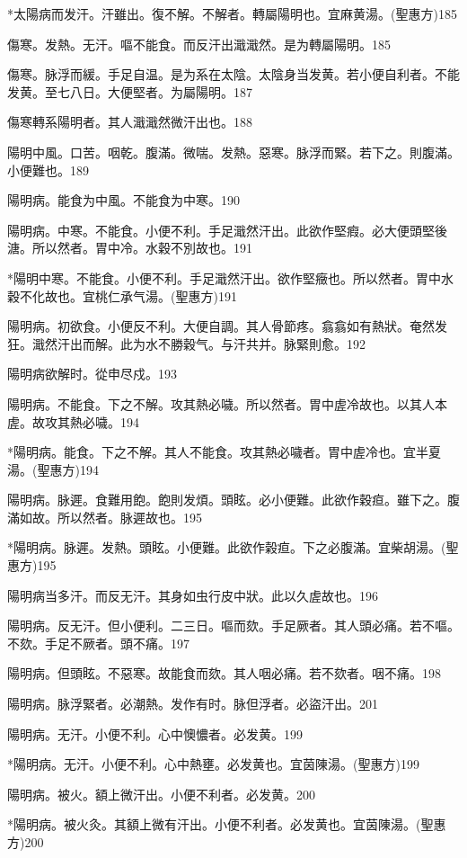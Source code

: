 \documentclass[b5paper,twoside,zihao=-4,UTF8]{ctexbook}
\begin{document}
*太陽病而发汗。汗雖出。復不解。不解者。轉屬陽明也。宜麻黄湯。(聖惠方)185

傷寒。发熱。无汗。嘔不能食。而反汗出濈濈然。是为轉屬陽明。185

傷寒。脉浮而緩。手足自温。是为系在太陰。太陰{身}当发黄。若小便自利者。不能发黄。至七八日。大便堅者。为屬陽明。187

傷寒轉系陽明者。其人濈濈然微汗出也。188

陽明中風。口苦。咽乾。腹滿。微喘。发熱。惡寒。脉浮而緊。若下之。則腹滿。小便難也。189

陽明病。能食为中風。不能食为中寒。190

陽明{病。}中寒。不能食。小便不利。手足濈然汗出。此欲作堅瘕。必大便頭堅後溏。所以然者。胃中冷。水穀不別故也。191

*陽明中寒。不能食。小便不利。手足濈然汗出。欲作堅癥也。所以然者。胃中水穀不化故也。宜桃仁承气湯。(聖惠方)191

陽明病。初欲食。小便反不利。大便自調。其人骨節疼。翕翕如有熱狀。奄然发狂。濈然汗出而解。此为水不勝穀气。与汗共并。脉緊則愈。192

陽明病欲解时。從申尽戍。193

陽明病。不能食。下之不解。攻其熱必噦。所以然者。胃中虗冷故也。{以其人本虗。故攻其熱必噦。}194

*陽明病。能食。下之不解。其人不能食。攻其熱必噦者。胃中虗冷也。宜半夏湯。(聖惠方)194

陽明病。脉遲。食難用飽。飽則发煩。頭眩。必小便難。此欲作穀疸。雖下之。腹滿如故。所以然者。脉遲故也。195

*陽明病。脉遲。发熱。頭眩。小便難。此欲作榖疸。下之必腹滿。宜柴胡湯。(聖惠方)195

陽明病当多汗。而反无汗。其身如虫行皮中狀。此以久虗故也。196

陽明病。反无汗。但小便利。二三日。嘔而欬。手足厥者。其人頭必痛。若不嘔。不欬。手足不厥者。頭不痛。197

陽明病。但頭眩。不惡寒。故能食而欬。其人咽必痛。若不欬者。咽不痛。198

陽明病。脉浮緊者。必潮熱。发作有时。{脉}但浮者。必盜汗出。201

陽明病。无汗。小便不利。心中懊憹者。必发黄。199

*陽明病。无汗。小便不利。心中熱壅。必发黄也。宜茵陳湯。(聖惠方)199

陽明病。被火。額上微汗出。小便不利者。必发黄。200

*陽明病。被火灸。其額上微有汗出。小便不利者。必发黄也。宜茵陳湯。(聖惠方)200
\end{document}
